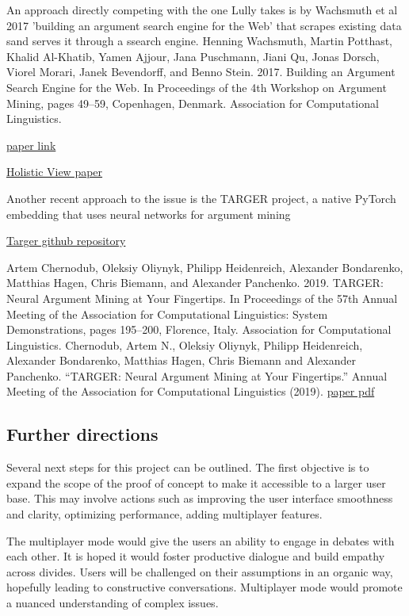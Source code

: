 \documentclass{article}
\begin{document}
An approach directly competing with the one Lully takes is by Wachsmuth et al 2017 'building an argument search engine for the Web' that scrapes existing data sand serves it through a ssearch engine.
Henning Wachsmuth, Martin Potthast, Khalid Al-Khatib, Yamen Ajjour, Jana Puschmann, Jiani Qu, Jonas Dorsch, Viorel Morari, Janek Bevendorff, and Benno Stein. 2017. Building an Argument Search Engine for the Web. In Proceedings of the 4th Workshop on Argument Mining, pages 49–59, Copenhagen, Denmark. Association for Computational Linguistics.

\href{ https://aclanthology.org/W17-5106.pdf }{paper link}

\href{https://www.semanticscholar.org/paper/Towards-a-Holistic-View-on-Argument-Quality-Fromm-Berrendorf/660fcd097881e7388f91b3724cdb0e2aeb9ff688}{Holistic View paper}

Another recent approach to the issue is the TARGER project, a native PyTorch embedding that uses neural networks for argument mining

\href{https://github.com/achernodub/targer}{Targer github repository}

Artem Chernodub, Oleksiy Oliynyk, Philipp Heidenreich, Alexander Bondarenko, Matthias Hagen, Chris Biemann, and Alexander Panchenko. 2019. TARGER: Neural Argument Mining at Your Fingertips. In Proceedings of the 57th Annual Meeting of the Association for Computational Linguistics: System Demonstrations, pages 195–200, Florence, Italy. Association for Computational Linguistics.
Chernodub, Artem N., Oleksiy Oliynyk, Philipp Heidenreich, Alexander Bondarenko, Matthias Hagen, Chris Biemann and Alexander Panchenko. “TARGER: Neural Argument Mining at Your Fingertips.” Annual Meeting of the Association for Computational Linguistics (2019).
\href{https://aclanthology.org/P19-3031/}{paper pdf}


\subsection{Further directions}
Several next steps for this project can be outlined. The first objective is to expand the scope of the proof of concept to make it accessible to a larger user base. This may involve actions such as improving the user interface smoothness and clarity, optimizing performance, adding multiplayer features.

The multiplayer mode would give the users an ability to engage in debates with each other. It is hoped it would foster productive dialogue and build empathy across divides.
Users will be challenged on their assumptions in an organic way, hopefully leading to constructive conversations. Multiplayer mode would promote a nuanced understanding of complex issues.
\end{document}
